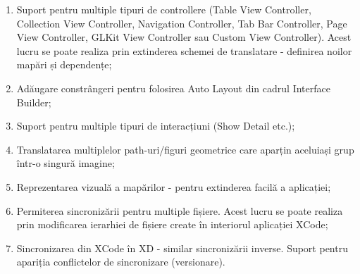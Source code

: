 \begin{enumerate}
\item Suport pentru multiple tipuri de controllere (Table View Controller, Collection View Controller, Navigation Controller, Tab Bar Controller, Page View Controller, GLKit View Controller sau Custom View Controller). Acest lucru se poate realiza prin extinderea schemei de translatare - definirea noilor mapări și dependențe;
\item Adăugare constrângeri pentru folosirea Auto Layout din cadrul Interface Builder;
\item Suport pentru multiple tipuri de interacțiuni (Show Detail etc.);
\item Translatarea multiplelor path-uri/figuri geometrice care aparțin aceluiași grup într-o singură imagine;
\item Reprezentarea vizuală a mapărilor - pentru extinderea facilă a aplicației;
\item Permiterea sincronizării pentru multiple fișiere. Acest lucru se poate realiza prin modificarea ierarhiei de fișiere create în interiorul aplicației XCode;
\item Sincronizarea din XCode în XD - similar sincronizării inverse. Suport pentru apariția conflictelor de sincronizare (versionare).
\end{enumerate}


